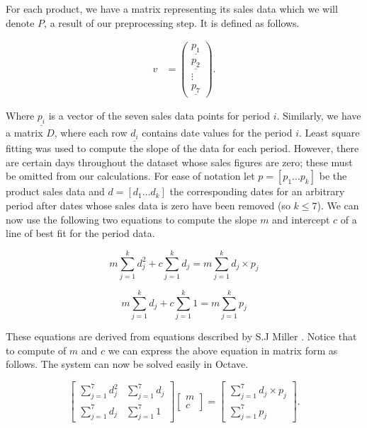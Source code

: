 For each product, we have a matrix representing its sales data which we will denote $P$, a result of our preprocessing step. It is defined as follows.

\begin{align}
   v &= \begin{pmatrix}
           \underline{p_{1}} \\
           \underline{p_{2}} \\
           \vdots \\
           \underline{p_{7}}
         \end{pmatrix}.
  \end{align}

Where $\underline{p_i}$ is a vector of the seven sales data points for period $i$. Similarly, we have a matrix $D$, where each row $\underline{d_i}$ contains date values for the period $i$. Least square fitting was used to compute the slope of the data for each period. However, there are certain days throughout the dataset whose sales figures are zero; these must be omitted from our calculations. For ease of notation let $p = [p_1 \dots p_k]$ be the product sales data and $d = [d_1 \dots d_k]$ the corresponding dates for an arbitrary period after dates whose sales data is zero have been removed (so $k \leq 7$). We can now use the following two equations to compute the slope $m$ and intercept $c$ of a line of best fit for the period data. 

$$
m\sum_{j = 1}^{k} d_{j}^2 + c\sum_{j = 1}^{k} d_{j} = m\sum_{j = 1}^{k} d_{j} \times p_{j}
$$

$$
m\sum_{j = 1}^{k} d_{j} + c\sum_{j = 1}^{k} 1 = m\sum_{j = 1}^{k}  p_{j}
$$

These equations are derived from equations described by S.J Miller \cite{squares}. Notice that to compute of $m$ and $c$ we can express the above equation in matrix form as follows. The system can now be solved easily in Octave.

\[
\begin{bmatrix}
\sum_{j = 1}^{7} d_{j}^2 & \sum_{j = 1}^{7} d_{j} \\
\sum_{j = 1}^{7} d_{j} & \sum_{j = 1}^{7} 1
\end{bmatrix}
\begin{bmatrix}
m\\
c
\end{bmatrix}
=
\begin{bmatrix}
\sum_{j = 1}^{7} d_{j} \times p_{j}\\
\sum_{j = 1}^{7}  p_{j}
\end{bmatrix}.
\]

